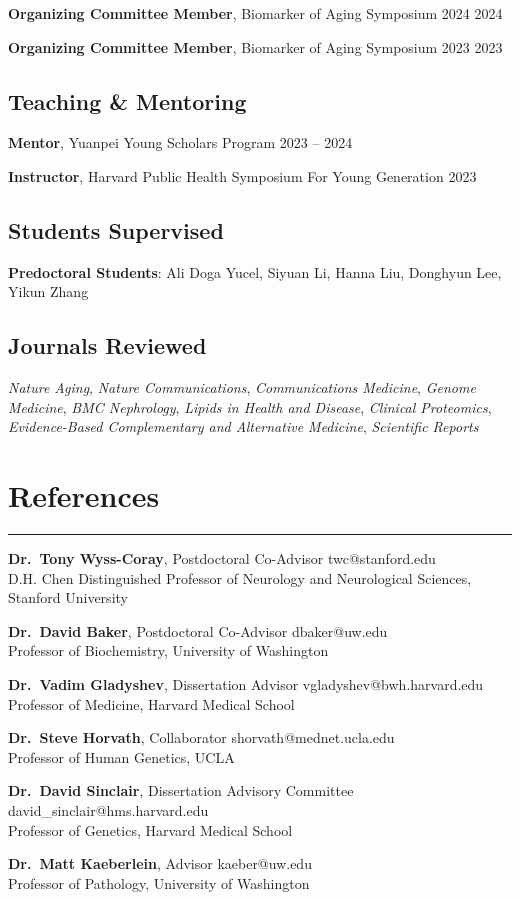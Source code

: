 \documentclass[
  11pt,
]
{article}
\begin{document}
\textbf{Organizing Committee Member}, Biomarker of Aging Symposium 2024
\hfill 2024

\textbf{Organizing Committee Member}, Biomarker of Aging Symposium 2023
\hfill 2023

\subsection{Teaching \& Mentoring}\label{teaching-mentoring}

\textbf{Mentor}, Yuanpei Young Scholars Program \hfill 2023 -- 2024

\textbf{Instructor}, Harvard Public Health Symposium For Young
Generation \hfill 2023

\subsection{Students Supervised}\label{students-supervised}

\textbf{Predoctoral Students}: Ali Doga Yucel, Siyuan Li, Hanna Liu,
Donghyun Lee, Yikun Zhang

\subsection{Journals Reviewed}\label{journals-reviewed}

\emph{Nature Aging}, \emph{Nature Communications}, \emph{Communications
Medicine}, \emph{Genome Medicine}, \emph{BMC Nephrology}, \emph{Lipids
in Health and Disease}, \emph{Clinical Proteomics}, \emph{Evidence-Based
Complementary and Alternative Medicine}, \emph{Scientific Reports}

\section{References}\label{references}

\hrule

\textbf{Dr.~Tony Wyss-Coray}, Postdoctoral Co-Advisor
\hfill twc@stanford.edu\\
D.H. Chen Distinguished Professor of Neurology and Neurological
Sciences, Stanford University

\textbf{Dr.~David Baker}, Postdoctoral Co-Advisor \hfill dbaker@uw.edu\\
Professor of Biochemistry, University of Washington

\textbf{Dr.~Vadim Gladyshev}, Dissertation Advisor
\hfill vgladyshev@bwh.harvard.edu\\
Professor of Medicine, Harvard Medical School

\textbf{Dr.~Steve Horvath}, Collaborator
\hfill shorvath@mednet.ucla.edu\\
Professor of Human Genetics, UCLA

\textbf{Dr.~David Sinclair}, Dissertation Advisory Committee
\hfill david\_sinclair@hms.harvard.edu\\
Professor of Genetics, Harvard Medical School

\textbf{Dr.~Matt Kaeberlein}, Advisor \hfill kaeber@uw.edu\\
Professor of Pathology, University of Washington
\end{document}
